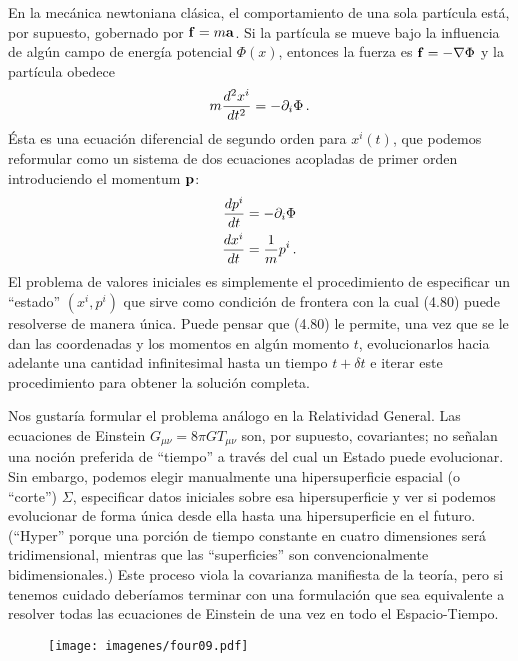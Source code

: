 \documentclass[11pt,b5paper,openany,twoside]{book}
\newcommand{\mn}{{\mu\nu}}
\newcommand{\p}[1]{{\partial_{#1}}}
\begin{document}
En la mecánica newtoniana clásica, el comportamiento de una sola partícula está, por supuesto, gobernado por ${\bf f} = m{\bf a}$.
Si la partícula se mueve bajo la influencia de algún campo de energía potencial $\Phi(x)$, entonces la fuerza es ${\bf f} = -\nabla \Phi$ y la partícula obedece
\begin{equation}
m{{d^2x^i}\over{dt^2}}=-\p{i}\Phi\,.\label{4.79}
\end{equation}
Ésta es una ecuación diferencial de segundo orden para $x^i(t)$, que podemos reformular como un sistema de dos ecuaciones acopladas de primer orden introduciendo el momentum ${\bf p}$:
\begin{align}
{{dp^i}\over{dt}} &=  -\p{i}\Phi \notag \\
{{dx^i}\over{dt}}  &=  {1\over m}p^i\,. \label{4.80}
\end{align}
El problema de valores iniciales es simplemente el procedimiento de especificar un ``estado'' $(x^i,p^i)$ que sirve como condición de frontera con la cual (4.80) puede resolverse de manera única.
Puede pensar que (4.80) le permite, una vez que se le dan las coordenadas y los momentos en algún momento $t$, evolucionarlos hacia adelante una cantidad infinitesimal hasta un tiempo $t+\delta t$ e iterar este procedimiento para obtener la solución completa.

Nos gustaría formular el problema análogo en la Relatividad General.
Las ecuaciones de Einstein $G_\mn = 8\pi G T_\mn$ son, por supuesto, covariantes; no señalan una noción preferida de ``tiempo'' a través del cual un Estado puede evolucionar.
Sin embargo, podemos elegir manualmente una hipersuperficie espacial (o ``corte'') $\Sigma$, especificar datos iniciales sobre esa hipersuperficie y ver si podemos evolucionar de forma única desde ella hasta una hipersuperficie en el futuro.
(``Hyper'' porque una porción de tiempo constante en cuatro dimensiones será tridimensional, mientras que las ``superficies'' son convencionalmente bidimensionales.)
Este proceso viola la covarianza manifiesta de la teoría, pero si tenemos cuidado deberíamos terminar con una formulación que sea equivalente a resolver todas las ecuaciones de Einstein de una vez en todo el Espacio-Tiempo.

\begin{figure}[h]
\centering
\texttt{[image: imagenes/four09.pdf]}
\end{figure}
\end{document}
